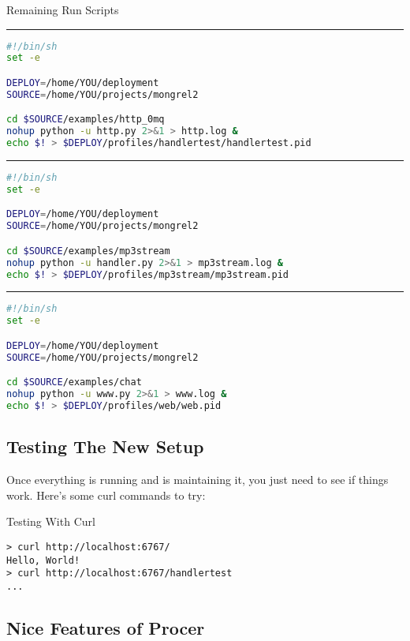 \begin{code}{Remaining Run Scripts}
\hrule

\begin{lstlisting}[language=sh]
#!/bin/sh
set -e

DEPLOY=/home/YOU/deployment
SOURCE=/home/YOU/projects/mongrel2

cd $SOURCE/examples/http_0mq
nohup python -u http.py 2>&1 > http.log &
echo $! > $DEPLOY/profiles/handlertest/handlertest.pid
\end{lstlisting}

\hrule

\begin{lstlisting}[language=sh]
#!/bin/sh
set -e

DEPLOY=/home/YOU/deployment
SOURCE=/home/YOU/projects/mongrel2

cd $SOURCE/examples/mp3stream
nohup python -u handler.py 2>&1 > mp3stream.log &
echo $! > $DEPLOY/profiles/mp3stream/mp3stream.pid
\end{lstlisting}


\hrule
\begin{lstlisting}[language=sh]
#!/bin/sh
set -e

DEPLOY=/home/YOU/deployment
SOURCE=/home/YOU/projects/mongrel2

cd $SOURCE/examples/chat
nohup python -u www.py 2>&1 > www.log &
echo $! > $DEPLOY/profiles/web/web.pid

\end{lstlisting}
\end{code}


\subsection{Testing The New Setup}

Once everything is running and  is maintaining it, you
just need to see if things work.  Here's some curl commands to try:

\begin{code}{Testing With Curl}
\begin{lstlisting}
> curl http://localhost:6767/
Hello, World!
> curl http://localhost:6767/handlertest
...
\end{lstlisting}
\end{code}


\subsection{Nice Features of Procer}

